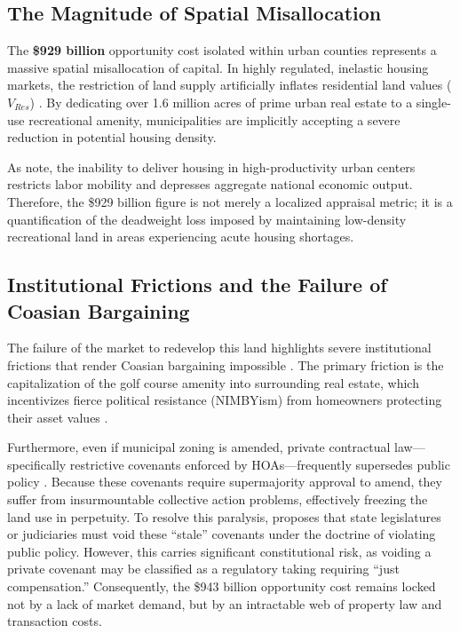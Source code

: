 \documentclass[10pt, letterpaper]{article}
\begin{document}
\subsection{The Magnitude of Spatial Misallocation}
The \textbf{\$929 billion} opportunity cost isolated within urban counties represents a massive spatial misallocation of capital. In highly regulated, inelastic housing markets, the restriction of land supply artificially inflates residential land values ($V_{Res}$) \parencite{Glaeser2005, Davis2021}. By dedicating over 1.6 million acres of prime urban real estate to a single-use recreational amenity, municipalities are implicitly accepting a severe reduction in potential housing density. 

As \textcite{Glaeser2017} note, the inability to deliver housing in high-productivity urban centers restricts labor mobility and depresses aggregate national economic output. Therefore, the \$929 billion figure is not merely a localized appraisal metric; it is a quantification of the deadweight loss imposed by maintaining low-density recreational land in areas experiencing acute housing shortages.

\subsection{Institutional Frictions and the Failure of Coasian Bargaining}
The failure of the market to redevelop this land highlights severe institutional frictions that render Coasian bargaining impossible \parencite{Coase1960}. The primary friction is the capitalization of the golf course amenity into surrounding real estate, which incentivizes fierce political resistance (NIMBYism) from homeowners protecting their asset values \parencite{Cheshire2002}.

Furthermore, even if municipal zoning is amended, private contractual law—specifically restrictive covenants enforced by HOAs—frequently supersedes public policy \parencite{Ellickson2022}. Because these covenants require supermajority approval to amend, they suffer from insurmountable collective action problems, effectively freezing the land use in perpetuity. To resolve this paralysis, \textcite{Korngold2024} proposes that state legislatures or judiciaries must void these ``stale'' covenants under the doctrine of violating public policy. However, this carries significant constitutional risk, as voiding a private covenant may be classified as a regulatory taking requiring ``just compensation.'' Consequently, the \$943 billion opportunity cost remains locked not by a lack of market demand, but by an intractable web of property law and transaction costs.
\end{document}
